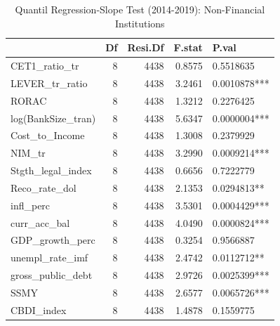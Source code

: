 \begin{table}[ht]
\centering
\caption{Quantil Regression-Slope Test (2014-2019): Non-Financial Institutions} 
\begingroup\small
\begin{tabular}{lrrrl}
  \toprule
 & Df & Resi.Df & F.stat & P.val \\ 
  \midrule
CET1\_ratio\_tr & 8 & 4438 & 0.8575 & 0.5518635 \\ 
  LEVER\_tr\_ratio & 8 & 4438 & 3.2461 & 0.0010878*** \\ 
  RORAC & 8 & 4438 & 1.3212 & 0.2276425 \\ 
  log(BankSize\_tran) & 8 & 4438 & 5.6347 & 0.0000004*** \\ 
  Cost\_to\_Income & 8 & 4438 & 1.3008 & 0.2379929 \\ 
  NIM\_tr & 8 & 4438 & 3.2990 & 0.0009214*** \\ 
  Stgth\_legal\_index & 8 & 4438 & 0.6656 & 0.7222779 \\ 
  Reco\_rate\_dol & 8 & 4438 & 2.1353 & 0.0294813** \\ 
  infl\_perc & 8 & 4438 & 3.5301 & 0.0004429*** \\ 
  curr\_acc\_bal & 8 & 4438 & 4.0490 & 0.0000824*** \\ 
  GDP\_growth\_perc & 8 & 4438 & 0.3254 & 0.9566887 \\ 
  unempl\_rate\_imf & 8 & 4438 & 2.4742 & 0.0112712** \\ 
  gross\_public\_debt & 8 & 4438 & 2.9726 & 0.0025399*** \\ 
  SSMY & 8 & 4438 & 2.6577 & 0.0065726*** \\ 
  CBDI\_index & 8 & 4438 & 1.4878 & 0.1559775 \\ 
   \bottomrule
\end{tabular}
\endgroup
\end{table}
